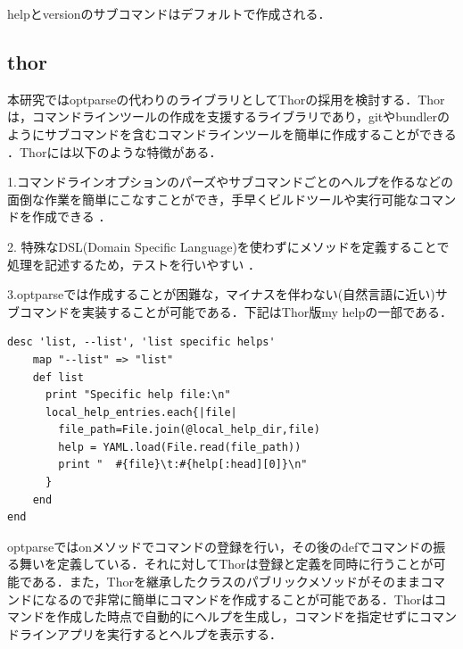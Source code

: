 helpとversionのサブコマンドはデフォルトで作成される．

\subsection{thor}\label{thor}

本研究ではoptparseの代わりのライブラリとしてThorの採用を検討する．Thorは，コマンドラインツールの作成を支援するライブラリであり，gitやbundlerのようにサブコマンドを含むコマンドラインツールを簡単に作成することができる
\cite{koichiro}．Thorには以下のような特徴がある．

1.コマンドラインオプションのパーズやサブコマンドごとのヘルプを作るなどの面倒な作業を簡単にこなすことができ，手早くビルドツールや実行可能なコマンドを作成できる
\cite{hibariya}．

2. 特殊なDSL(Domain Specific
Language)を使わずにメソッドを定義することで処理を記述するため，テストを行いやすい
\cite{hibariya}．

3.optparseでは作成することが困難な，マイナスを伴わない(自然言語に近い)サブコマンドを実装することが可能である．下記はThor版my helpの一部である．

\begin{screen}
{\small
\begin{verbatim}
desc 'list, --list', 'list specific helps'
    map "--list" => "list"
    def list
      print "Specific help file:\n"
      local_help_entries.each{|file|
        file_path=File.join(@local_help_dir,file)
        help = YAML.load(File.read(file_path))
        print "  #{file}\t:#{help[:head][0]}\n"
      }
    end
end
\end{verbatim}}
\end{screen}


optparseではonメソッドでコマンドの登録を行い，その後のdefでコマンドの振る舞いを定義している．それに対してThorは登録と定義を同時に行うことが可能である．また，Thorを継承したクラスのパブリックメソッドがそのままコマンドになるので非常に簡単にコマンドを作成することが可能である．Thorはコマンドを作成した時点で自動的にヘルプを生成し，コマンドを指定せずにコマンドラインアプリを実行するとヘルプを表示する．

